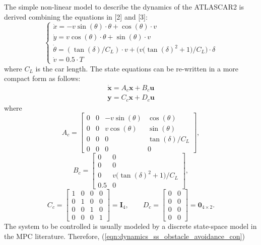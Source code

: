 \documentclass[conference, 11pt]{IEEEtran}
\begin{document}
The simple non-linear model to describe the dynamics of the ATLASCAR2 is derived combining the equations in [2] and [3]:
\begin{equation*}
	\label{eqn:dynamics_model_obstacle_avoidance}
	\left \{ \begin{array}{llll}
	\dot{x} = -v\sin(\theta)\cdot\theta+\cos(\theta)\cdot v\\
	\dot{y} = v\cos(\theta)\cdot\theta+\sin(\theta)\cdot v\\
	\dot{\theta} =(\tan(\delta)/C_L)\cdot v+ \bigg(v\bigg(\tan(\delta)^2+1\bigg)/C_L\bigg)\cdot \delta\\
	\dot{v} =0.5\cdot T
	\end{array} 
	\right .
\end{equation*}
where $C_L$ is the car length. The state equations can be re-written in a more compact form as follows:
\begin{equation}
	\label{eqn:dynamics_ss_obstacle_avoidance_con}
	\begin{array}{ll}
	\dot{\textbf{x}} =A_c \textbf{x}+ B_c \textbf{u}\\
	\textbf{y} =C_c \textbf{x} + D_c \textbf{u}
	\end{array}
\end{equation}
where
\[ 
A_c=\begin{bmatrix}
0&0&-v\sin(\theta)&\cos(\theta)\\
0&0&v\cos(\theta)&\sin(\theta)\\
0&0&0&\tan(\delta)/C_L\\
0&0&0&0
\end{bmatrix},
\]
\[
B_c=\begin{bmatrix}
0&0\\
0&0\\
0&v\bigg(\tan(\delta)^2+1\bigg)/C_L\\
0.5&0
\end{bmatrix},
\]
\[
C_c=\begin{bmatrix}
1&0&0&0\\
0&1&0&0\\
0&0&1&0\\
0&0&0&1
\end{bmatrix} = \textbf{I}_4, 
\qquad
D_c=\begin{bmatrix}
0&0\\
0&0\\
0&0\\
0&0
\end{bmatrix} = \textbf{0}_{4\times2}. 
\]
The system to be controlled is usually modeled by a discrete state-space model in the MPC literature. Therefore, (\ref{eqn:dynamics_ss_obstacle_avoidance_con})
\end{document}
